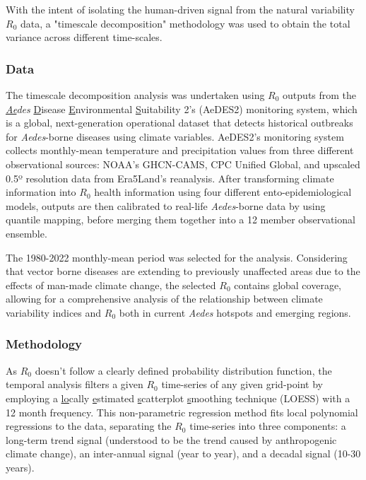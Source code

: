 \documentclass[
	a4paper, %
	8pt, %
	unnumberedsections, %
	twoside, %
]{LTJournalArticle}
\begin{document}
  With the intent of isolating the human-driven signal from the natural variability $R_0$ data, a "timescale decomposition" methodology was used to obtain the total variance across different time-scales. 

  \subsubsection{Data} \label{sec-methods-1-data}
  The timescale decomposition analysis was undertaken using $R_0$ outputs from the \textit{\underline{Ae}des} \underline{D}isease \underline{E}nvironmental \underline{S}uitability 2's (AeDES2) monitoring system, which is a global, next-generation operational dataset that detects historical outbreaks for \textit{Aedes}-borne diseases using climate variables. AeDES2's monitoring system collects monthly-mean temperature and precipitation values from three different observational sources: NOAA's GHCN-CAMS, CPC Unified Global, and upscaled 0.5º resolution data from Era5Land's reanalysis. After transforming climate information into $R_0$ health information using four different ento-epidemiological models, outputs are then calibrated to real-life \textit{Aedes}-borne data by using quantile mapping, before merging them together into a 12 member observational ensemble.

  The 1980-2022 monthly-mean period was selected for the analysis. Considering that vector borne diseases are extending to previously unaffected areas due to the effects of man-made climate change, the selected $R_0$ contains global coverage, allowing for a comprehensive analysis of the relationship between climate variability indices and $R_0$ both in current \textit{Aedes} hotspots and emerging regions.

  \subsubsection{Methodology} \label{sec-methods-1-methodology}

  As $R_0$ doesn't follow a clearly defined probability distribution function, the temporal analysis filters a given $R_0$ time-series of any given grid-point by employing a \underline{lo}cally \underline{e}stimated \underline{s}catterplot \underline{s}moothing technique (LOESS) with a 12 month frequency. This non-parametric regression method fits local polynomial regressions to the data, separating the $R_0$ time-series into three components: a long-term trend signal (understood to be the trend caused by anthropogenic climate change), an inter-annual signal (year to year), and a decadal signal (10-30 years). 
\end{document}
